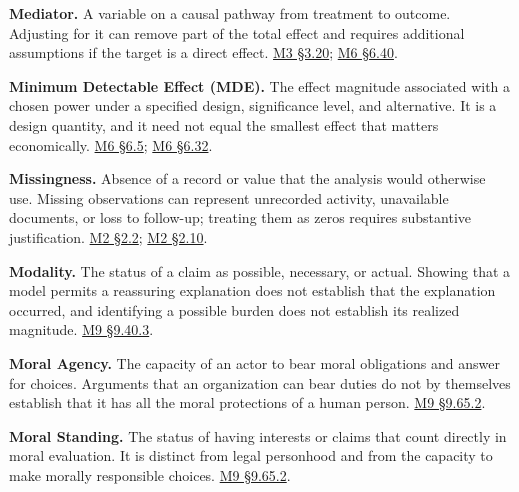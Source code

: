 \noindent\textbf{Mediator.} A variable on a causal pathway from treatment to
outcome. Adjusting for it can remove part of the total effect and
requires additional assumptions if the target is a direct effect.
\href{Marketing_Analytics_Lecture_Notes.pdf\#M03-a-control-variable-needs-a-causal-role}{M3
§3.20};
\href{Marketing_Analytics_Lecture_Notes.pdf\#M06-treatment-affected-covariates-in-a-panel}{M6
§6.40}.

\noindent\textbf{Minimum Detectable Effect (MDE).} The effect magnitude
associated with a chosen power under a specified design, significance
level, and alternative. It is a design quantity, and it need not equal
the smallest effect that matters economically.
\href{Marketing_Analytics_Lecture_Notes.pdf\#M06-power-precision-and-the-minimum-useful-effect}{M6
§6.5};
\href{Marketing_Analytics_Lecture_Notes.pdf\#M06-statistical-detection-and-a-profitable-campaign}{M6
§6.32}.

\noindent\textbf{Missingness.} Absence of a record or value that the analysis
would otherwise use. Missing observations can represent unrecorded
activity, unavailable documents, or loss to follow-up; treating them as
zeros requires substantive justification.
\href{Marketing_Analytics_Lecture_Notes.pdf\#M02-build-a-customer-table-without-losing-customers}{M2
§2.2};
\href{Marketing_Analytics_Lecture_Notes.pdf\#M02-mhealth-recorded-variety-and-missing-days}{M2
§2.10}.

\noindent\textbf{Modality.} The status of a claim as possible, necessary, or
actual. Showing that a model permits a reassuring explanation does not
establish that the explanation occurred, and identifying a possible
burden does not establish its realized magnitude.
\hyperref[M09-compatibility-identification-and-valuation]{M9
§9.40.3}.

\noindent\textbf{Moral Agency.} The capacity of an actor to bear moral
obligations and answer for choices. Arguments that an organization can
bear duties do not by themselves establish that it has all the moral
protections of a human person.
\hyperref[M09-corporate-duties-and-human-protections]{M9
§9.65.2}.

\noindent\textbf{Moral Standing.} The status of having interests or claims that
count directly in moral evaluation. It is distinct from legal personhood
and from the capacity to make morally responsible choices.
\hyperref[M09-corporate-duties-and-human-protections]{M9
§9.65.2}.

